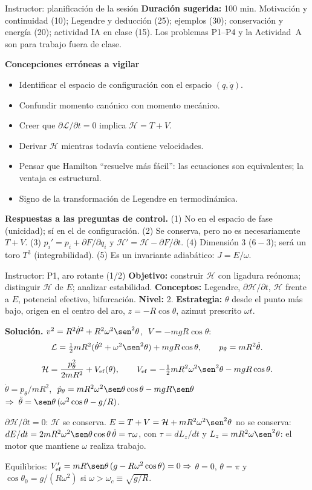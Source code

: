 \documentclass[spanish]{beamer}
\newcommand{\Lag}{\mathcal{L}}               %
\newcommand{\Ham}{\mathcal{H}}               %
\begin{document}
\begin{frame}{Instructor: planificación de la sesión}
\small
\textbf{Duración sugerida:} 100 min.
Motivación y continuidad (10); Legendre y deducción (25); ejemplos (30);
conservación y energía (20); actividad IA en clase (15).
Los problemas P1--P4 y la Actividad~A son para trabajo fuera de clase.

\medskip
\textbf{Concepciones erróneas a vigilar}
\begin{itemize}
  \item Identificar el espacio de configuración con el espacio $(q,\dot q)$.
  \item Confundir momento canónico con momento mecánico.
  \item Creer que $\partial\Lag/\partial t=0$ implica $\Ham=T+V$.
  \item Derivar $\Ham$ mientras todavía contiene velocidades.
  \item Pensar que Hamilton “resuelve más fácil”: las ecuaciones son equivalentes;
        la ventaja es estructural.
  \item Signo de la transformación de Legendre en termodinámica.
\end{itemize}

\medskip
\textbf{Respuestas a las preguntas de control.}
(1) No en el espacio de fase (unicidad); sí en el de configuración.
(2) Se conserva, pero no es necesariamente $T+V$.
(3) $p_i'=p_i+\partial F/\partial q_i$ y $\Ham'=\Ham-\partial F/\partial t$.
(4) Dimensión 3 ($6-3$); será un toro $T^3$ (integrabilidad).
(5) Es un invariante adiabático: $J=E/\omega$.
\end{frame}

\begin{frame}{Instructor: P1, aro rotante (1/2)}
\scriptsize
\textbf{Objetivo:} construir $\Ham$ con ligadura reónoma; distinguir $\Ham$ de $E$;
analizar estabilidad. \textbf{Conceptos:} Legendre, $\partial\Ham/\partial t$, $\Ham$ frente a $E$,
potencial efectivo, bifurcación. \textbf{Nivel:} 2.
\textbf{Estrategia:} $\theta$ desde el punto más bajo, origen en el centro del aro, $z=-R\cos\theta$,
azimut prescrito $\omega t$.

\medskip
\textbf{Solución.}
$v^2=R^2\dot\theta^2+R^2\omega^2\sen^2\theta$, $\;V=-mgR\cos\theta$:
\[
  \Lag=\tfrac12 mR^2(\dot\theta^2+\omega^2\sen^2\theta)+mgR\cos\theta,\qquad
  p_\theta=mR^2\dot\theta .
\]
\[
  \Ham=\frac{p_\theta^2}{2mR^2}+V_{\mathrm{ef}}(\theta),\qquad
  V_{\mathrm{ef}}=-\tfrac12 mR^2\omega^2\sen^2\theta-mgR\cos\theta .
\]
$\dot\theta=p_\theta/mR^2$, $\;\dot p_\theta=mR^2\omega^2\sen\theta\cos\theta-mgR\sen\theta$
$\Rightarrow\;\ddot\theta=\sen\theta\,(\omega^2\cos\theta-g/R)$.

$\partial\Ham/\partial t=0$: $\Ham$ se conserva. $E=T+V=\Ham+mR^2\omega^2\sen^2\theta$ no se conserva:
$dE/dt=2mR^2\omega^2\sen\theta\cos\theta\,\dot\theta=\tau\omega$, con $\tau=dL_z/dt$ y
$L_z=mR^2\omega\sen^2\theta$: el motor que mantiene $\omega$ realiza trabajo.

\medskip
Equilibrios: $V_{\mathrm{ef}}'=mR\sen\theta\,(g-R\omega^2\cos\theta)=0\Rightarrow$
$\theta=0$, $\theta=\pi$ y $\cos\theta_0=g/(R\omega^2)$ si $\omega>\omega_c\equiv\sqrt{g/R}$.
\end{frame}
\end{document}
